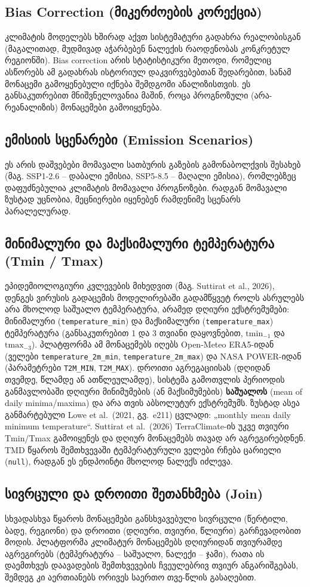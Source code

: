 \documentclass[11pt,a4paper]{article}
\begin{document}
\subsection{Bias Correction (მიკერძოების კორექცია)}
კლიმატის მოდელებს ხშირად აქვთ სისტემატური გადახრა რეალობისგან
(მაგალითად, მუდმივად აჭარბებენ ნალექის რაოდენობას კონკრეტულ რეგიონში).
Bias correction არის სტატისტიკური მეთოდი, რომელიც ასწორებს ამ გადახრას
ისტორიულ დაკვირვებებთან შედარებით, სანამ მონაცემი გამოყენებული იქნება
შემდგომი ანალიზისთვის. ეს განსაკუთრებით მნიშვნელოვანია მაშინ, როცა
პროგნოზული (არა-რეანალიზის) მონაცემები გამოიყენება.

\subsection{ემისიის სცენარები (Emission Scenarios)}
ეს არის დაშვებები მომავალი სათბურის გაზების გამონაბოლქვის შესახებ
(მაგ. SSP1-2.6 -- დაბალი ემისია, SSP5-8.5 -- მაღალი ემისია), რომლებზეც
დაფუძნებულია კლიმატის მომავალი პროგნოზები. რადგან მომავალი ზუსტად
უცნობია, მეცნიერები იყენებენ რამდენიმე სცენარს პარალელურად.

\subsection{მინიმალური და მაქსიმალური ტემპერატურა (Tmin / Tmax)}
ეპიდემიოლოგიური კვლევების მიხედვით (მაგ. Suttirat et al., 2026),
დენგეს ვირუსის გადაცემის მოდელირებაში გადამწყვეტ როლს ასრულებს არა
მხოლოდ საშუალო ტემპერატურა, არამედ დღიური ექსტრემუმები: მინიმალური
(\texttt{temperature\_min}) და მაქსიმალური (\texttt{temperature\_max})
ტემპერატურა (განსაკუთრებით 1 და 3 თვიანი დაყოვნებით, $\mathrm{tmin}_{-1}$
და $\mathrm{tmax}_{-3}$).
პლატფორმა ამ მონაცემებს იღებს Open-Meteo ERA5-იდან (ველები
\texttt{temperature\_2m\_min}, \texttt{temperature\_2m\_max}) და NASA POWER-იდან
(პარამეტრები \texttt{T2M\_MIN}, \texttt{T2M\_MAX}).
დროითი აგრეგაციისას (დღიდან თვემდე, წლამდე ან ათწლეულამდე), სისტემა
გამოთვლის პერიოდის განმავლობაში დღიური მინიმუმების (ან მაქსიმუმების)
\textbf{საშუალოს} (mean of daily minima/maxima) და არა თვის აბსოლუტურ ექსტრემუმს.
ზუსტად ასეა განმარტებული Lowe et al.\ (2021, გვ.~e211) ცვლადი: „monthly mean daily
minimum temperature“. Suttirat et al.\ (2026) TerraClimate-ის უკვე თვიური Tmin/Tmax
გამოიყენეს და დღიურ მონაცემებს თავად არ აგრეგირებდნენ. TMD
წყაროს შემთხვევაში ტემპერატურული ველები რჩება ცარიელი (\texttt{null}), რადგან
ეს ენდპოინტი მხოლოდ ნალექს იძლევა.

\subsection{სივრცული და დროითი შეთანხმება (Join)}
სხვადასხვა წყაროს მონაცემები განსხვავებული სივრცული (წერტილი, ბადე,
რეგიონი) და დროითი (დღიური, თვიური, წლიური) გარჩევადობით მოდის.
პლატფორმა კლიმატურ მონაცემებს დღიურიდან თვიურამდე აგრეგირებს
(ტემპერატურა -- საშუალო, ნალექი -- ჯამი), რათა ის დაემთხვეს დაავადების
შემთხვევების ჩვეულებრივ თვიურ ანგარიშგებას, შემდეგ კი აერთიანებს
ორივეს საერთო თვე-წლის გასაღებით.
\end{document}

